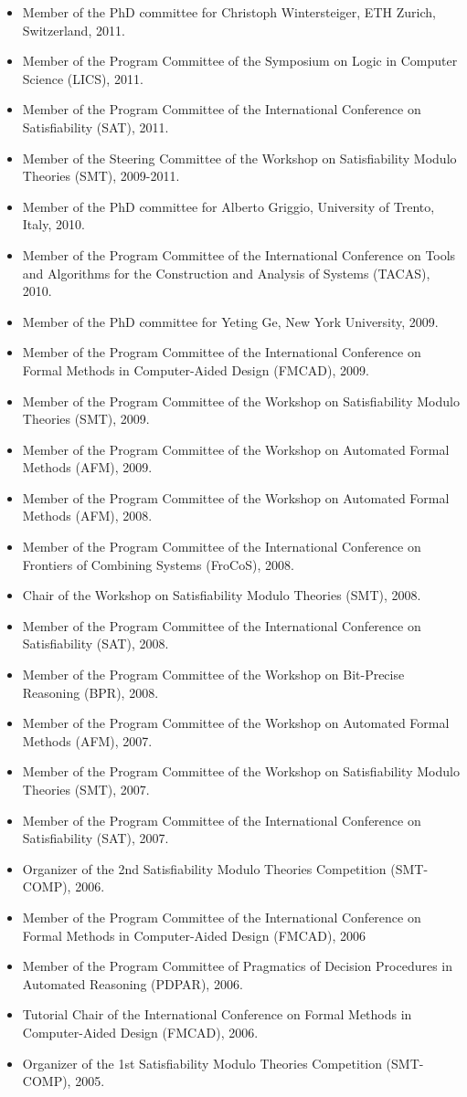 \documentclass{article}
\begin{document}
\begin{itemize}
\item Member of the PhD committee for Christoph Wintersteiger, ETH Zurich, Switzerland, 2011.
\item Member of the Program Committee of the Symposium on Logic in Computer Science (LICS), 2011.
\item Member of the Program Committee of the International Conference on Satisfiability (SAT), 2011.
\item Member of the Steering Committee of the Workshop on Satisfiability Modulo Theories (SMT), 2009-2011.
\item Member of the PhD committee for Alberto Griggio, University of Trento, Italy, 2010.
\item Member of the Program Committee of the International Conference on Tools and Algorithms for the Construction and Analysis of Systems (TACAS), 2010.
\item Member of the PhD committee for Yeting Ge, New York University, 2009.
\item Member of the Program Committee of the International Conference on Formal Methods in Computer-Aided Design (FMCAD), 2009.
\item Member of the Program Committee of the Workshop on Satisfiability Modulo Theories (SMT), 2009.
\item Member of the Program Committee of the Workshop on Automated Formal Methods (AFM), 2009.
\item Member of the Program Committee of the Workshop on Automated Formal Methods (AFM), 2008.
\item Member of the Program Committee of the International Conference on Frontiers of Combining Systems (FroCoS), 2008.
\item Chair of the Workshop on Satisfiability Modulo Theories (SMT), 2008.
\item Member of the Program Committee of the International Conference on Satisfiability (SAT), 2008.
\item Member of the Program Committee of the Workshop on Bit-Precise Reasoning (BPR), 2008.
\item Member of the Program Committee of the Workshop on Automated Formal Methods (AFM), 2007.
\item Member of the Program Committee of the Workshop on Satisfiability Modulo Theories (SMT), 2007.
\item Member of the Program Committee of the International Conference on Satisfiability (SAT), 2007.
\item Organizer of the 2nd Satisfiability Modulo Theories Competition (SMT-COMP), 2006.
\item Member of the Program Committee of the International Conference on Formal Methods in Computer-Aided Design (FMCAD), 2006
\item Member of the Program Committee of Pragmatics of Decision Procedures in Automated Reasoning (PDPAR), 2006.
\item Tutorial Chair of the International Conference on Formal Methods in Computer-Aided Design (FMCAD), 2006.
\item Organizer of the 1st Satisfiability Modulo Theories Competition (SMT-COMP), 2005.
\end{itemize}
\end{document}
